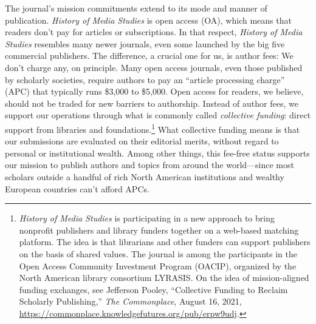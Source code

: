 \documentclass{tufte-handout}
\begin{document}
The journal's mission commitments extend to its mode and manner of
publication. \emph{History of Media Studies} is open access (OA), which
means that readers don't pay for articles or subscriptions. In that
respect, \emph{History of Media Studies} resembles many newer journals,
even some launched by the big five commercial publishers. The
difference, a crucial one for us, is author fees: We don't charge any,
on principle. Many open access journals, even those published by
scholarly societies, require authors to pay an ``article processing
charge'' (APC) that typically runs \$3,000 to \$5,000. Open access for
readers, we believe, should not be traded for new barriers to
authorship. Instead of author fees, we support our operations through
what is commonly called \emph{collective funding}: direct support from
libraries and foundations.\footnote{\emph{History of Media Studies} is participating in a new approach to
  bring nonprofit publishers and library funders together on a web-based
  matching platform. The idea is that librarians and other funders can
  support publishers on the basis of shared values. The journal is among
  the participants in the Open Access Community Investment Program
  (OACIP), organized by the North American library consortium LYRASIS.
  On the idea of mission-aligned funding exchanges, see Jefferson
  Pooley, ``Collective Funding to Reclaim Scholarly Publishing,''
  \emph{The Commonplace}, August 16, 2021,
  \url{https://commonplace.knowledgefutures.org/pub/erpw9udj}.
} What
collective funding means is that our submissions are evaluated on their
editorial merits, without regard to personal or institutional wealth.
Among other things, this fee-free status supports our mission to publish
authors and topics from around the world---since most scholars outside a
handful of rich North American institutions and wealthy European
countries can't afford APCs.
\end{document}
